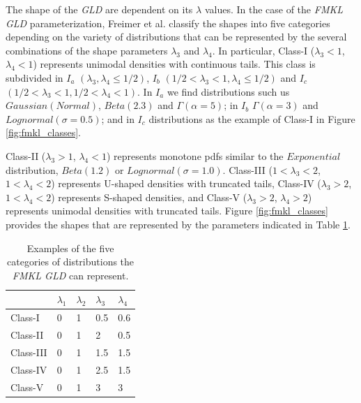 The shape of the \textit{GLD} are dependent on its $\lambda$ values. In the case of the \textit{FMKL GLD} parameterization, Freimer et al. \cite{Freimer1988} classify the shapes into five categories depending on the variety of distributions that can be represented by the several combinations of the shape parameters $\lambda_{3}$ and $\lambda_{4}$. In particular, Class-I ($\lambda_{3} < 1$, $\lambda_{4}<1$) represents unimodal densities with continuous tails. This class is subdivided in $I_{a}$ $(\lambda_{3}, \lambda_{4} \leq 1/2)$, $I_{b}$ $(1/2 < \lambda_{3} < 1, \lambda_{4} \leq 1/2)$ and $I_{c}$ $(1/2 < \lambda_{3} < 1, 1/2 < \lambda_{4} < 1)$. In $I_{a}$ we find distributions such us $Gaussian (Normal)$, $Beta(2.3)$ and $\Gamma(\alpha = 5)$; in $I_{b}$ $\Gamma(\alpha = 3)$ and $Lognormal(\sigma=0.5)$; and in $I_{c}$ distributions as the example of Class-I in Figure \ref{fig:fmkl_classes}.  

Class-II ($\lambda_{3}>1$, $\lambda_{4}<1$) represents monotone pdfs similar to the $Exponential$ distribution, $Beta(1.2)$ or $Lognormal(\sigma=1.0)$. Class-III ($1<\lambda_{3}<2$, $1<\lambda_{4}<2$) represents U-shaped densities with truncated tails, Class-IV ($\lambda_{3}>2$, $1<\lambda_{4}<2$) represents S-shaped densities, and Class-V ($\lambda_{3}>2$, $\lambda_{4}>2$) represents unimodal densities with truncated tails. Figure \ref{fig:fmkl_classes} provides the shapes that are represented by the parameters indicated in Table \ref{tab:fmkl_classes}.

\begin{table}[H]
\centering
\caption{Examples of the five categories of distributions the \textit{FMKL GLD} can represent.}
\label{tab:fmkl_classes}
\begin{tabular}{lllll}
\hline
          & $\lambda_{1}$ & $\lambda_{2}$ & $\lambda_{3}$ & $\lambda_{4}$ \\ \hline
Class-I   & 0             & 1             & 0.5           & 0.6           \\
Class-II  & 0             & 1             & 2             & 0.5           \\
Class-III & 0             & 1             & 1.5           & 1.5           \\
Class-IV  & 0             & 1             & 2.5           & 1.5           \\
Class-V   & 0             & 1             & 3             & 3             \\ \hline
\end{tabular}
\end{table}

